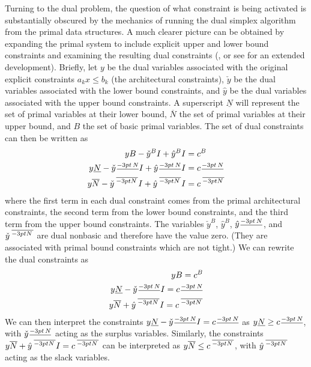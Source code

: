 Turning to the dual problem, the question of what constraint is being activated
is substantially obscured by the mechanics of running the dual simplex
algorithm from the primal data structures.
A much clearer picture can be obtained by expanding the primal system to
include explicit upper and lower bound constraints and examining the
resulting dual constraints
(\cite[\S3.4]{For92}, or see \cite{Haf98a} for an extended development).
Briefly, let $y$ be the dual variables associated with the original
explicit constraints $a_k x \leq b_k$
(the architectural constraints), $\check{y}$ be the dual variables associated
with the lower bound constraints, and $\hat{y}$ be the dual variables
associated with the upper bound constraints.
A superscript $\underline{N}$ will represent the set of primal variables at
their lower bound, $\overline{N}$ the set of primal variables at their upper
bound, and $B$ the set of basic primal variables.
The set of dual constraints can then be written as
\begin{equation*}
\begin{aligned}
yB - \check{y}^{B}I + \hat{y}^{B}I & = c^B \\
y\underline{N} - \check{y}^{\nblb}I +
	\hat{y}^{\nblb}I & = c^{\nblb} \\
y\overline{N} - \check{y}^{\nbub}I +
	\hat{y}^{\nbub}I & = c^{\nbub}
\end{aligned}
\end{equation*}
where the first term in each dual constraint comes from the primal
architectural constraints, the second term from the lower bound constraints,
and the third term from the upper bound constraints.
The variables $\check{y}^{B}$, $\hat{y}^{B}$, $\hat{y}^{\nblb}$,
and $\check{y}^{\nbub}$ are dual nonbasic and therefore have the value
zero.
(They are associated with primal bound constraints which are not tight.)
We can rewrite the dual constraints as
\begin{equation*}
\begin{aligned}
yB = c^B \\
y\underline{N} - \check{y}^{\nblb}I = c^{\nblb} \\
y\overline{N} + \hat{y}^{\nbub}I = c^{\nbub}
\end{aligned}
\end{equation*}
We can then interpret the constraints
$y\underline{N} - \check{y}^{\nblb}I = c^{\nblb}$
as $y\underline{N} \geq c^{\nblb}$, with $\check{y}^{\nblb}$ acting as the
surplus variables.
Similarly, the constraints
$y\overline{N} + \hat{y}^{\nbub}I = c^{\nbub}$ can be interpreted as
$y\overline{N} \leq c^{\nbub}$, with $\hat{y}^{\nbub}$ acting as the slack
variables.

